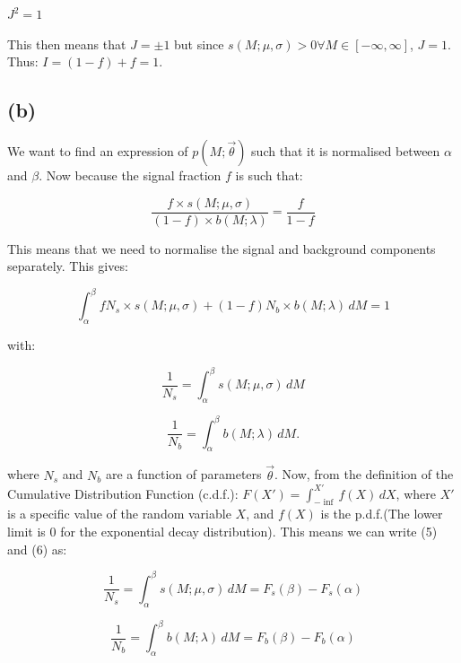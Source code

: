 \documentclass[12pt]{report} %
\begin{document}
$J^{2} = 1$ 

\vspace*{1\baselineskip}
This then means that $J = \pm 1$ but since $s(M;\mu,\sigma) > 0 \forall M \in [-\infty,\infty]$, $ J = 1$. Thus: $I = (1-f) + f = 1$.  


\subsection*{(b)}
We want to find an expression of $p(M;\vec{\theta})$ such that it is normalised between $\alpha$ and $\beta$. Now because the signal fraction $f$ is such that:

\begin{equation}
    \frac{f \times s(M;\mu,\sigma)}{(1 - f)\times b(M;\lambda)} = \frac{f}{1-f}
\end{equation}

This means that we need to normalise the signal and background components separately. This gives:

\begin{equation}
    \displaystyle \int_{\alpha}^{\beta} f N_{s} \times s(M;\mu,\sigma) + (1 - f)N_{b} \times b(M;\lambda)\, dM = 1
\end{equation}  

with:

\begin{equation}
    \frac{1}{N_{s}} = \displaystyle \int_{\alpha}^{\beta} s(M;\mu,\sigma)\, dM
\end{equation}

\begin{equation}
    \frac{1}{N_{b}} = \displaystyle \int_{\alpha}^{\beta} b(M;\lambda)\, dM.
\end{equation}

\vspace*{1\baselineskip}
where $N_{s}$ and $N_{b}$ are a function of parameters $\vec{\theta}$. Now, from the definition of the Cumulative Distribution Function (c.d.f.): $F(X') = \int_{-\inf}^{X'} f(X)\, dX$, where $X'$ is a specific value of the random variable $X$, and $f(X)$ is the p.d.f.(The lower limit is 0 for the exponential decay distribution)\cite[pp. 20-24]{Wass}. This means we can write (5) and (6) as:

\begin{equation}
    \frac{1}{N_{s}} = \displaystyle \int_{\alpha}^{\beta} s(M;\mu,\sigma)\, dM = F_{s}(\beta) - F_{s}(\alpha)
\end{equation}

\begin{equation}
    \frac{1}{N_{b}} = \displaystyle \int_{\alpha}^{\beta} b(M;\lambda)\, dM = F_{b}(\beta) - F_{b}(\alpha)
\end{equation}
\end{document}

